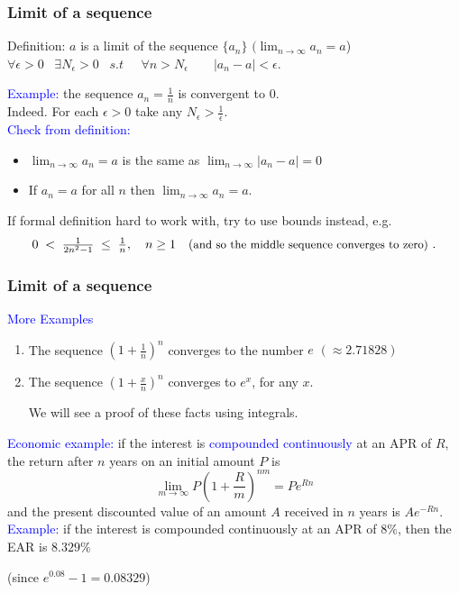 \documentclass[11pt,aspectratio=169]{beamer}
\begin{document}
\begin{frame}
\frametitle{Limit of a sequence}
\begin{alertblock}{Definition: $a$ is a limit of the sequence $\{a_n\}$\;\; $(\lim_{n\to \infty}a_n=a$)}
\qquad\qquad$
\forall \epsilon >0 \;\;\; \exists N_{\epsilon}>0\;\;\; s.t\;\;\;\;\;\forall n>N_{\epsilon}\quad\quad \vert a_n-a \vert < \epsilon.
$	
\end{alertblock}

 \textcolor{blue}{Example:}  the sequence $a_n=\frac{1}{n}$ is convergent to 0. \\[3mm]
\qquad Indeed. For each $\epsilon>0$ take any $N_{\epsilon}>\frac{1}{\epsilon}$. \\[2mm]
 \textcolor{blue}{Check from definition:} 
 \begin{itemize}
 	\item $\lim_{n\to\infty} a_n=a$ is the same as $\lim_{n\to \infty} |a_n-a|=0$\\[2mm]
 	\item If $a_n=a$ for all $n$ then $\lim_{n\to\infty}a_n=a$.
 \end{itemize}
\begin{block}{If formal definition hard to work with, try to use \alert{bounds} instead, e.g.}
$$
0\;<\;\tfrac{1}{2n^2-1}\;\leq\; \tfrac{1}{n}, \quad n \geq 1 \quad \mbox{{(\small and so the middle sequence converges to zero)}	}.
$$
\end{block}
\end{frame}

\begin{frame}
\frametitle{Limit of a sequence}
\textcolor{blue}{More Examples} 
\begin{enumerate}

\item The sequence $\left(1+\frac{1}{n}\right)^n$ converges to the number $e$  $(\approx 2.71828)$ 
\item The sequence $\left(1+\frac{x}{n}\right)^n$ converges to $e^x$, for any $x$. \begin{tiny}We will see a proof of these facts using integrals.  \end{tiny}
\end{enumerate}


\textcolor{blue}{Economic example:} if the interest is \textcolor{blue}{compounded continuously} at an APR of $R$, the return after $n$ years on an initial amount $P$ is 
$$
\lim_{m\rightarrow \infty} P\left(1+\frac{R}{m}\right)^{n m}=P e^{Rn}
$$ 
and the present discounted value of an amount $A$ received in $n$ years is $A e^{-Rn}$. 
\vskip 12pt
\textcolor{blue}{Example:} if the interest is compounded continuously at an APR of $8\%$, then the EAR is $8.329\%$ \begin{tiny}(since $e^{0.08}-1=0.08329$) \end{tiny}  


\end{frame}
\end{document}
